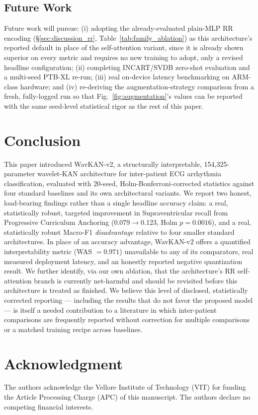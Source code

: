 \documentclass[journal,twoside,web]{ieeecolor}
\begin{document}
\subsection{Future Work}
Future work will pursue: (i) adopting the already-evaluated plain-MLP RR encoding (\S\ref{sec:discussion_rr}, Table~\ref{tab:family_ablation}) as this architecture's reported default in place of the self-attention variant, since it is already shown superior on every metric and requires no new training to adopt, only a revised headline configuration; (ii) completing INCART/SVDB zero-shot evaluation and a multi-seed PTB-XL re-run; (iii) real on-device latency benchmarking on ARM-class hardware; and (iv) re-deriving the augmentation-strategy comparison from a fresh, fully-logged run so that Fig.~\ref{fig:augmentation}'s values can be reported with the same seed-level statistical rigor as the rest of this paper.

\section{Conclusion}
\label{sec:conclusion}
This paper introduced WavKAN-v2, a structurally interpretable, 154,325-parameter wavelet-KAN architecture for inter-patient ECG arrhythmia classification, evaluated with 20-seed, Holm-Bonferroni-corrected statistics against four standard baselines and its own architectural variants. We report two honest, load-bearing findings rather than a single headline accuracy claim: a real, statistically robust, targeted improvement in Supraventricular recall from Progressive Curriculum Anchoring (0.079$\to$0.123, Holm $p=0.0016$), and a real, statistically robust Macro-F1 \emph{disadvantage} relative to four smaller standard architectures. In place of an accuracy advantage, WavKAN-v2 offers a quantified interpretability metric (WAS $=0.971$) unavailable to any of its comparators, real measured deployment latency, and an honestly reported negative quantization result. We further identify, via our own ablation, that the architecture's RR self-attention branch is currently net-harmful and should be revisited before this architecture is treated as finished. We believe this level of disclosed, statistically corrected reporting --- including the results that do not favor the proposed model --- is itself a needed contribution to a literature in which inter-patient comparisons are frequently reported without correction for multiple comparisons or a matched training recipe across baselines.

\section*{Acknowledgment}
The authors acknowledge the Vellore Institute of Technology (VIT) for funding the Article Processing Charge (APC) of this manuscript. The authors declare no competing financial interests.
\end{document}
